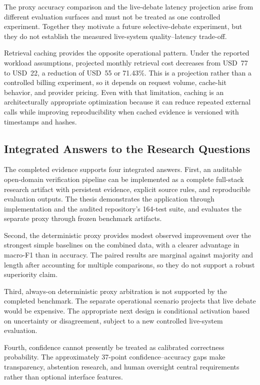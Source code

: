 \documentclass[12pt,a4paper,openany]{report}
\begin{document}
The proxy accuracy comparison and the live-debate latency projection arise
from different evaluation surfaces and must not be treated as one controlled
experiment. Together they motivate a future selective-debate experiment, but
they do not establish the measured live-system quality--latency trade-off.

Retrieval caching provides the opposite operational pattern. Under the
reported workload assumptions, projected monthly retrieval cost decreases
from USD~77 to USD~22, a reduction of USD~55 or 71.43\%. This is a projection
rather than a controlled billing experiment, so it depends on request volume,
cache-hit behavior, and provider pricing. Even with that limitation, caching
is an architecturally appropriate optimization because it can reduce
repeated external calls while improving reproducibility when cached evidence
is versioned with timestamps and hashes.

\subsection{Integrated Answers to the Research Questions}
The completed evidence supports four integrated answers. First, an auditable
open-domain verification pipeline can be implemented as a complete
full-stack research artifact with persistent evidence, explicit source rules,
and reproducible evaluation outputs. The thesis demonstrates the application
through implementation and the audited repository's 164-test suite, and evaluates the separate
proxy through frozen benchmark artifacts.

Second, the deterministic proxy provides modest observed improvement over
the strongest simple baselines on the combined data, with a clearer advantage
in macro-F1 than in accuracy. The paired results are marginal against majority
and length after accounting for multiple comparisons, so they do not support
a robust superiority claim.

Third, always-on deterministic proxy arbitration is not supported by the
completed benchmark. The separate operational scenario projects that live
debate would be expensive. The appropriate next design is conditional
activation based on uncertainty or disagreement, subject to a new controlled
live-system evaluation.

Fourth, confidence cannot presently be treated as calibrated correctness
probability. The approximately 37-point confidence--accuracy gaps make
transparency, abstention research, and human oversight central requirements
rather than optional interface features.
\end{document}
